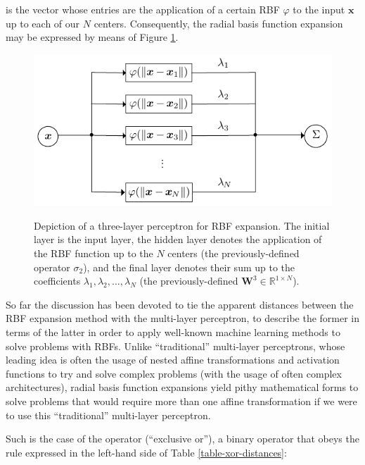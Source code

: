 \documentclass[12pt]{report} %
\newcommand{\tmmathbf}[1]{\ensuremath{\boldsymbol{#1}}}
\newcommand{\tmverbatim}[1]{\text{{\ttfamily{#1}}}}
\begin{document}
is the vector whose entries are the application of a certain RBF $\varphi$ to the input
$\tmmathbf{x}$ up to each of our $N$ centers. Consequently, the radial basis
function expansion may be expressed by means of Figure \ref{fig-rbf-drawing}.
\begin{figure}[ht]
  {\includegraphics[width=.7\textwidth]{imagenes/rbf_discussion/rbf-nn-graph.pdf}}
  \caption{Depiction of a three-layer perceptron for RBF expansion. The
  initial layer is the input layer, the hidden layer denotes the application
  of the RBF function up to the $N$ centers (the previously-defined operator
  $\sigma_2$), and the final layer denotes their sum up to the coefficients
  $\lambda_1, \lambda_2, \ldots, \lambda_N$ (the previously-defined
  $\tmmathbf{W}^3 \in \mathbb{R}^{1 \times N}$).
  \label{fig-rbf-drawing}}
\end{figure}

So far the discussion has been devoted to tie the apparent distances between
the RBF expansion method with the multi-layer perceptron, to describe the
former in terms of the latter in order to apply well-known machine learning
methods to solve problems with RBFs. Unlike ``traditional'' multi-layer
perceptrons, whose leading idea is often the usage of nested affine
transformations and activation functions to try and solve complex problems
(with the usage of often complex architectures), radial basis function
expansions yield pithy mathematical forms to solve problems that would require
more than one affine transformation if we were to use this ``traditional''
multi-layer perceptron.

Such is the case of the \tmverbatim{xor} operator (``exclusive or''), a
binary operator that obeys the rule expressed in the left-hand side of Table
\ref{table-xor-distances}:
\end{document}
